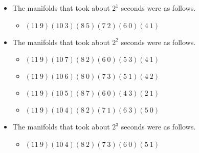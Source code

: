 \documentclass{article}
\begin{document}
\begin{itemize}
\item The manifolds that took about $2^{1}$ seconds were as follows.
\begin{itemize}
\item $(11\ 9)(10\ 3)(8\ 5)(7\ 2)(6\ 0)(4\ 1)$
\end{itemize}
\item The manifolds that took about $2^{2}$ seconds were as follows.
\begin{itemize}
\item $(11\ 9)(10\ 7)(8\ 2)(6\ 0)(5\ 3)(4\ 1)$
\item $(11\ 9)(10\ 6)(8\ 0)(7\ 3)(5\ 1)(4\ 2)$
\item $(11\ 9)(10\ 5)(8\ 7)(6\ 0)(4\ 3)(2\ 1)$
\item $(11\ 9)(10\ 4)(8\ 2)(7\ 1)(6\ 3)(5\ 0)$
\end{itemize}
\item The manifolds that took about $2^{3}$ seconds were as follows.
\begin{itemize}
\item $(11\ 9)(10\ 4)(8\ 2)(7\ 3)(6\ 0)(5\ 1)$
\end{itemize}
\end{itemize}
\end{document}
